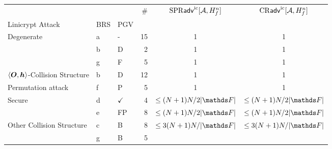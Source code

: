 \begin{tabular}{lllrcc}
\toprule
 &  &  & \# & $\mathrm{SPR}\mathsf{adv}^{\mathrm{ic}}[\mathcal{A}, H^n_f]$ & $\mathrm{CR}\mathsf{adv}^{\mathrm{ic}}[\mathcal{A}, H^n_f]$ \\
Linicrypt Attack & BRS & PGV &  &  &  \\
\midrule
\multirow[c]{3}{*}{Degenerate} & a & - & 15 & 1 & 1 \\
\cline{2-6} \cline{3-6}
 & b & D & 2 & 1 & 1 \\
\cline{2-6} \cline{3-6}
 & g & F & 5 & 1 & 1 \\
\cline{1-6} \cline{2-6} \cline{3-6}
$\langle\boldsymbol{O}, \boldsymbol h\rangle$-Collision Structure & b & D & 12 & 1 & 1 \\
\cline{1-6} \cline{2-6} \cline{3-6}
Permutation attack & f & P & 5 & 1 & 1 \\
\cline{1-6} \cline{2-6} \cline{3-6}
\multirow[c]{2}{*}{Secure} & d & $\checkmark$ & 4 & $\leq (N+1)N/2|\F|$ & $\leq (N+1)N/2|\F|$ \\
\cline{2-6} \cline{3-6}
 & e & FP & 8 & $\leq (N+1)N/2|\F|$ & $\leq (N+1)N/2|\F|$ \\
\cline{1-6} \cline{2-6} \cline{3-6}
\multirow[c]{2}{*}{Other Collision Structure} & c & B & 8 & $\leq 3(N+1)N/|\F|$ & $\leq 3(N+1)N/|\F|$ \\
\cline{2-6} \cline{3-6}
 & g & B & 5 &  &  \\
\cline{1-6} \cline{2-6} \cline{3-6}
\bottomrule
\end{tabular}
